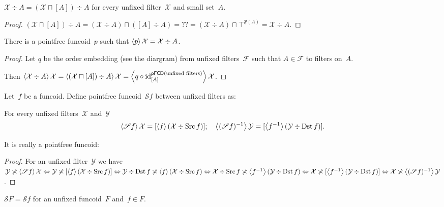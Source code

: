 \begin{lem}
$\mathcal{X}\div A=(\mathcal{X}\sqcap[A])\div A$
for every unfixed filter~$\mathcal{X}$ and small set~$A$.
\end{lem}

\begin{proof}
$(\mathcal{X}\sqcap[A])\div A=
(\mathcal{X}\div A)\sqcap([A]\div A)=
??=
(\mathcal{X}\div A)\sqcap\top^{\mathfrak{F}(A)}=
\mathcal{X}\div A$.
\end{proof}

\begin{cor}
There is a pointfree funcoid~$p$ such that
$\left\langle p\right\rangle\mathcal{X}=\mathcal{X}\div A$.
\end{cor}

\begin{proof}
Let $q$ be the order embedding (see the diargram) from
unfixed filters~$\mathcal{F}$ such that $A\in\mathcal{F}$
to filters on~$A$.

Then
$\left\langle \mathcal{X}\div A\right\rangle\mathcal{X}=
\left\langle (\mathcal{X}\sqcap[A])\div A\right\rangle\mathcal{X}=
\left\langle q\circ\operatorname{id}^{\mathsf{pFCD}(\text{unfixed filters})}_{[A]}\right\rangle\mathcal{X}$.
\end{proof}

Let~$f$ be a funcoid. Define pointfree
funcoid~$\mathscr{S}f$ between unfixed filters as:

\begin{defn}
For every unfixed filters~$\mathcal{X}$
and~$\mathcal{Y}$
\[
\left\langle \mathscr{S}f\right\rangle\mathcal{X}=
[\left\langle f\right\rangle(\mathcal{X}\div\operatorname{Src} f)];\quad
\left\langle (\mathscr{S}f)^{-1}\right\rangle\mathcal{Y}=
[\left\langle f^{-1}\right\rangle(\mathcal{Y}\div\operatorname{Dst} f)].
\]
\end{defn}

It is really a pointfree funcoid:

\begin{proof}
For an unfixed filter~$\mathcal{Y}$ we have
$\mathcal{Y}\not\asymp\left\langle \mathscr{S}f\right\rangle\mathcal{X}
\Leftrightarrow
\mathcal{Y}\not\asymp[\left\langle f\right\rangle(\mathcal{X}\div\operatorname{Src} f)]
\Leftrightarrow
\mathcal{Y}\div\operatorname{Dst} f\not\asymp\left\langle f\right\rangle(\mathcal{X}\div\operatorname{Src} f)
\Leftrightarrow
\mathcal{X}\div\operatorname{Src} f\not\asymp\left\langle f^{-1}\right\rangle(\mathcal{Y}\div\operatorname{Dst} f)
\Leftrightarrow
\mathcal{X}\not\asymp[\left\langle f^{-1}\right\rangle(\mathcal{Y}\div\operatorname{Dst} f)]
\Leftrightarrow
\mathcal{X}\not\asymp\left\langle (\mathscr{S}f)^{-1}\right\rangle\mathcal{Y}$.
\end{proof}

\begin{defn}
$\mathscr{S}F=\mathscr{S}f$ for an unfixed funcoid~$F$
and~$f\in F$.
\end{defn}

